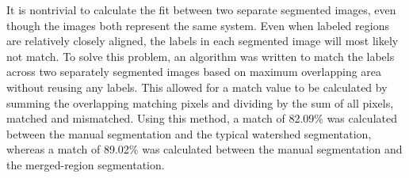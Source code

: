 It is nontrivial to calculate the fit between two separate segmented images, even
though the images both represent the same system. Even when labeled regions are
relatively closely aligned, the labels in each segmented image will most likely not
match. To solve this problem, an algorithm was written to match the labels across two
separately segmented images based on maximum overlapping area without
reusing any labels. This allowed for a match value to be calculated by summing the
overlapping matching pixels and dividing by the sum of all pixels, matched and
mismatched. Using this method,
a match of 82.09\% was calculated between the manual segmentation and the
typical watershed segmentation,
whereas a match of 89.02\% was calculated between the manual
segmentation and the merged-region segmentation.

